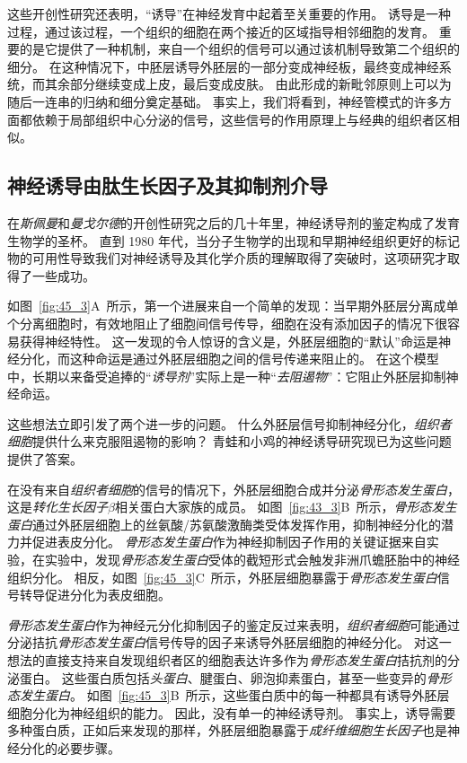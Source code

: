 这些开创性研究还表明，“诱导”在神经发育中起着至关重要的作用。
诱导是一种过程，通过该过程，一个组织的细胞在两个接近的区域指导相邻细胞的发育。
重要的是它提供了一种机制，来自一个组织的信号可以通过该机制导致第二个组织的细分。
在这种情况下，中胚层诱导外胚层的一部分变成神经板，最终变成神经系统，而其余部分继续变成上皮，最后变成皮肤。
由此形成的新毗邻原则上可以为随后一连串的归纳和细分奠定基础。
事实上，我们将看到，神经管模式的许多方面都依赖于局部组织中心分泌的信号，这些信号的作用原理上与经典的组织者区相似。



\subsection{神经诱导由肽生长因子及其抑制剂介导}

在\textit{斯佩曼}和\textit{曼戈尔德}的开创性研究之后的几十年里，神经诱导剂的鉴定构成了发育生物学的圣杯。
直到 1980 年代，当分子生物学的出现和早期神经组织更好的标记物的可用性导致我们对神经诱导及其化学介质的理解取得了突破时，这项研究才取得了一些成功。


如图~\ref{fig:45_3}A~所示，第一个进展来自一个简单的发现：当早期外胚层分离成单个分离细胞时，有效地阻止了细胞间信号传导，细胞在没有添加因子的情况下很容易获得神经特性。
这一发现的令人惊讶的含义是，外胚层细胞的“默认”命运是神经分化，而这种命运是通过外胚层细胞之间的信号传递来阻止的。
在这个模型中，长期以来备受追捧的“\textit{诱导剂}”实际上是一种“\textit{去阻遏物}”：它阻止外胚层抑制神经命运。


这些想法立即引发了两个进一步的问题。
什么外胚层信号抑制神经分化，\textit{组织者细胞}提供什么来克服阻遏物的影响？
青蛙和小鸡的神经诱导研究现已为这些问题提供了答案。


在没有来自\textit{组织者细胞}的信号的情况下，外胚层细胞合成并分泌\textit{骨形态发生蛋白}，这是\textit{转化生长因子$\beta$}相关蛋白大家族的成员。
如图~\ref{fig:43_3}B~所示，\textit{骨形态发生蛋白}通过外胚层细胞上的丝氨酸/苏氨酸激酶类受体发挥作用，抑制神经分化的潜力并促进表皮分化。
\textit{骨形态发生蛋白}作为神经抑制因子作用的关键证据来自实验，在实验中，发现\textit{骨形态发生蛋白}受体的截短形式会触发非洲爪蟾胚胎中的神经组织分化。
相反，如图~\ref{fig:45_3}C~所示，外胚层细胞暴露于\textit{骨形态发生蛋白}信号转导促进分化为表皮细胞。


\textit{骨形态发生蛋白}作为神经元分化抑制因子的鉴定反过来表明，\textit{组织者细胞}可能通过分泌拮抗\textit{骨形态发生蛋白}信号传导的因子来诱导外胚层细胞的神经分化。
对这一想法的直接支持来自发现组织者区的细胞表达许多作为\textit{骨形态发生蛋白}拮抗剂的分泌蛋白。
这些蛋白质包括\textit{头蛋白}、腱蛋白、卵泡抑素蛋白，甚至一些变异的\textit{骨形态发生蛋白}。
如图~\ref{fig:45_3}B~所示，这些蛋白质中的每一种都具有诱导外胚层细胞分化为神经组织的能力。
因此，没有单一的神经诱导剂。
事实上，诱导需要多种蛋白质，正如后来发现的那样，外胚层细胞暴露于\textit{成纤维细胞生长因子}也是神经分化的必要步骤。



